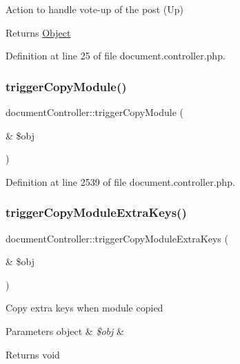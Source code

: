 Action to handle vote-\/up of the post (Up) \begin{DoxyReturn}{Returns}
\hyperlink{classObject}{Object} 
\end{DoxyReturn}


Definition at line 25 of file document.\+controller.\+php.

\mbox{\label{classdocumentController_a612ee2c47ff03e76f6e86fa31ff098a7}} 
\subsubsection{\texorpdfstring{trigger\+Copy\+Module()}{triggerCopyModule()}}
{\footnotesize\ttfamily document\+Controller\+::trigger\+Copy\+Module (\begin{DoxyParamCaption}\item[{\&}]{\$obj }\end{DoxyParamCaption})}



Definition at line 2539 of file document.\+controller.\+php.

\mbox{\label{classdocumentController_a5e03be29c7b61f87658b604ba80daa88}} 
\subsubsection{\texorpdfstring{trigger\+Copy\+Module\+Extra\+Keys()}{triggerCopyModuleExtraKeys()}}
{\footnotesize\ttfamily document\+Controller\+::trigger\+Copy\+Module\+Extra\+Keys (\begin{DoxyParamCaption}\item[{\&}]{\$obj }\end{DoxyParamCaption})}

Copy extra keys when module copied 
\begin{DoxyParams}[1]{Parameters}
object & {\em \$obj} & \\
\hline
\end{DoxyParams}
\begin{DoxyReturn}{Returns}
void 
\end{DoxyReturn}


